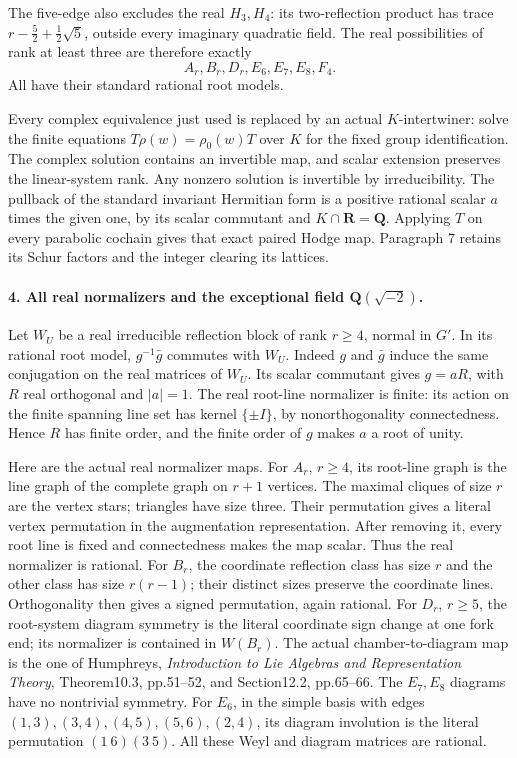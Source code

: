 The five-edge also excludes the real \(H_3,H_4\):
its two-reflection product has trace
\(r-\tfrac52+\tfrac12\sqrt5\), outside every imaginary
quadratic field. The real possibilities of rank at least three
are therefore exactly
\[
                       A_r,B_r,D_r,E_6,E_7,E_8,F_4.          \tag{G27.12}
\]
All have their standard rational root models.

Every complex equivalence just used is replaced by an actual
\(K\)-intertwiner: solve the finite equations
\(T\rho(w)=\rho_0(w)T\) over \(K\) for the fixed group
identification. The complex solution contains an invertible map,
and scalar extension preserves the linear-system rank.
Any nonzero solution is invertible by irreducibility.
The pullback of the standard invariant Hermitian form is a
positive rational scalar \(a\) times the given one, by its
scalar commutant and \(K\cap\mathbf R=\mathbf Q\).
Applying \(T\) on every parabolic cochain gives that exact
paired Hodge map. Paragraph 7 retains its Schur factors and
the integer clearing its lattices.

\paragraph{4. All real normalizers and the exceptional field \(\mathbf Q(\sqrt{-2})\).}
Let \(W_U\) be a real irreducible reflection block of rank
\(r\ge4\), normal in \(G'\). In its rational root model,
\(g^{-1}\bar g\) commutes with \(W_U\). Indeed \(g\) and
\(\bar g\) induce the same conjugation on the real matrices
of \(W_U\). Its scalar commutant gives
\(g=aR\), with \(R\) real orthogonal and \(|a|=1\).
The real root-line normalizer is finite: its action on the
finite spanning line set has kernel \(\{\pm I\}\), by
nonorthogonality connectedness. Hence \(R\) has finite order,
and the finite order of \(g\) makes \(a\) a root of unity.

Here are the actual real normalizer maps. For \(A_r\),
\(r\ge4\), its root-line graph is the line graph of the
complete graph on \(r+1\) vertices. The maximal cliques
of size \(r\) are the vertex stars; triangles have size three.
Their permutation gives a literal vertex permutation in the
augmentation representation. After removing it, every root
line is fixed and connectedness makes the map scalar.
Thus the real normalizer is rational.
For \(B_r\), the coordinate reflection class has size \(r\)
and the other class has size \(r(r-1)\); their distinct sizes
preserve the coordinate lines. Orthogonality then gives a
signed permutation, again rational.
For \(D_r\), \(r\ge5\), the root-system diagram symmetry
is the literal coordinate sign change at one fork end;
its normalizer is contained in \(W(B_r)\).
The actual chamber-to-diagram map is the one of Humphreys,
\emph{Introduction to Lie Algebras and Representation Theory},
Theorem10.3, pp.51--52, and Section12.2, pp.65--66.
The \(E_7,E_8\) diagrams have no nontrivial symmetry.
For \(E_6\), in the simple basis with edges
\((1,3),(3,4),(4,5),(5,6),(2,4)\), its diagram involution
is the literal permutation \((1\ 6)(3\ 5)\).
All these Weyl and diagram matrices are rational.

